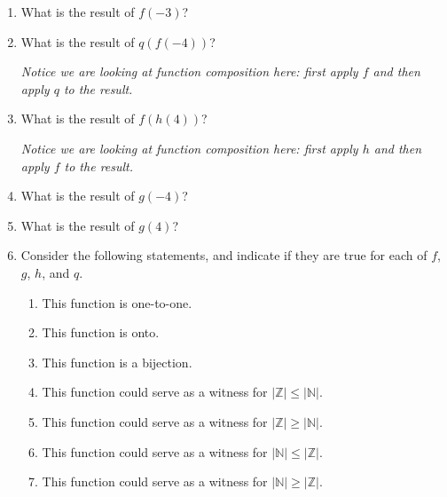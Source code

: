 \begin{enumerate}
\item What is the result of $f(-3)$?

\item What is the result of $q(f(-4))$?

 {\it Notice we are looking at function composition here: first apply $f$ and then apply 
 $q$ to the result.}

\item What is the result of $f(h(4))$? 

{\it Notice we are looking at function composition here: first apply $h$ and then apply 
$f$ to the result.}

\item What is the result of $g(-4)$?

\item What is the result of $g(4)$?

\item Consider the following statements, and indicate if they are true for each of $f$, $g$, $h$, and $q$.

\begin{enumerate}[label=\roman*.]
    \item This function is one-to-one.
    \item This function is onto.
    \item This function is a bijection.
    \item This function could serve as a witness for $|\mathbb{Z}| \leq |\mathbb{N}|$.
    \item This function could serve as a witness for $|\mathbb{Z}| \geq |\mathbb{N}|$.
    \item This function could serve as a witness for $|\mathbb{N}| \leq |\mathbb{Z}|$.
    \item This function could serve as a witness for $|\mathbb{N}| \geq |\mathbb{Z}|$.
\end{enumerate}

\end{enumerate}